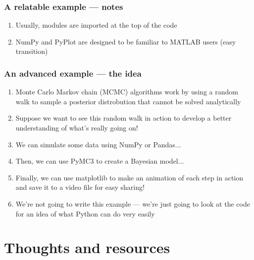 \documentclass{beamer}
\begin{document}
\begin{frame}
\frametitle{A relatable example --- notes}
	\begin{enumerate}
		\item Usually, modules are imported at the top of the code

		\item NumPy and PyPlot are designed to be familiar to MATLAB users (easy transition)
	\end{enumerate}
\end{frame}

\begin{frame}
\frametitle{An advanced example --- the idea}
\begin{enumerate}
	\item Monte Carlo Markov chain (MCMC) algorithms work by using a random walk to sample a posterior distrobution that cannot be solved analytically

	\item Suppose we want to see this random walk in action to develop a better understanding of what's really going on!

	\item We can simulate some data using NumPy or Pandas... 
	
	\item Then, we can use PyMC3 to create a Bayesian model...

	\item Finally, we can use matplotlib to make an animation of each step in action and save it to a video file for easy sharing!

	\item We're not going to write this example --- we're just going to look at the code for an idea of what Python can do very easily
\end{enumerate}
\end{frame}

\section{Thoughts and resources}
\end{document}
